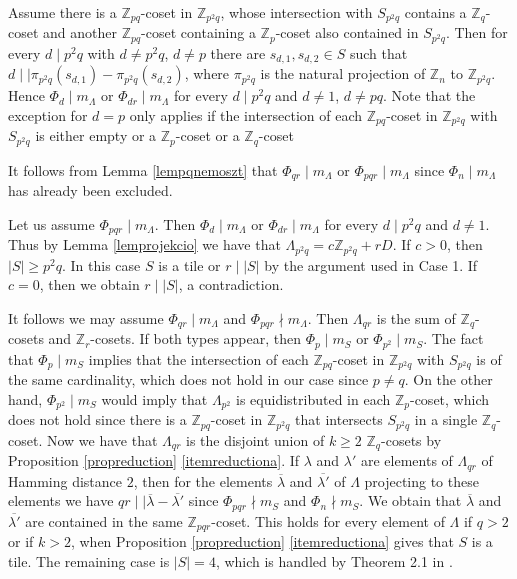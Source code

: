 \documentclass[10pt]{article}
\newcommand{\Z}{\mathbb{Z}}
\newcommand{\La}{\Lambda}
\begin{document}
        Assume there  is a $\Z_{pq}$-coset in $\Z_{p^2q}$, whose intersection with $S_{p^2q}$
        contains a $\Z_q$-coset and another $\Z_{pq}$-coset containing a $\Z_p$-coset also contained in $S_{p^2q}$. 
        Then for every $d \mid p^2q$ with $d \ne p^2q$, $d \ne p$ there are $s_{d,1},s_{d,2} \in S$ such that $d \mid \mid \pi_{p^2q}(s_{d,1})-\pi_{p^2q}(s_{d,2})$, where $\pi_{p^2q}$ is the natural projection of $\Z_n$ to $\Z_{p^2q}$. Hence $\Phi_{d} \mid m_{\La}$ or $\Phi_{dr} \mid m_{\La}$ for every $ d \mid p^2q$ and $d \ne 1$, $d \ne pq$. Note that the exception for $d=p$ only applies if the intersection of each $\Z_{pq}$-coset in $\Z_{p^2q}$ with $S_{p^2q}$ is either empty or a $\Z_p$-coset or a $\Z_q$-coset 
        
        It follows from Lemma \ref{lempqnemoszt} that $\Phi_{qr} \mid m_{\Lambda}$ or $\Phi_{pqr} \mid m_{\Lambda}$ since $\Phi_{n} \mid m_{\Lambda}$ has already been excluded.   
        
        
        
        Let us assume $\Phi_{pqr} \mid m_{\Lambda}$.
        Then $\Phi_{d} \mid m_{\La}$ or $\Phi_{dr} \mid m_{\La}$ for every $ d \mid p^2q$ and $d \ne 1$. Thus by Lemma \ref{lemprojekcio} we have that $\La_{p^2q}=c\Z_{p^2q}+rD$. If $c>0$, then $|S|\ge p^2q$. In this case $S$ is a tile or $r \mid |S|$ by the argument used in Case 1.  
        If $c=0$, then we obtain $r \mid |S|$, a contradiction. 
        
        It follows we may assume $\Phi_{qr} \mid m_{\Lambda}$ and $\Phi_{pqr} \nmid m_{\Lambda}$. Then $\Lambda_{qr}$ is the sum of $\Z_q$-cosets and $\Z_r$-cosets. If both types appear, then $\Phi_p \mid m_S$ or $\Phi_{p^2} \mid m_S$. The fact that $\Phi_p \mid m_S$ implies that   the intersection of each $\Z_{pq}$-coset in $\Z_{p^2q}$ with $S_{p^2q}$ is of the same cardinality, which does not hold in our case since $p \ne q$. On the other hand, $\Phi_{p^2} \mid m_S$ would imply that $\Lambda_{p^2}$ is equidistributed in each $\Z_p$-coset, which does not hold since there is a $\Z_{pq}$-coset in $\Z_{p^2q}$ that intersects $S_{p^2q}$ in a single $\Z_q$-coset. 
        Now we have that $\Lambda_{qr}$ is the disjoint union of $k\ge 2$ $\Z_q$-cosets  by Proposition \ref{propreduction} \ref{itemreductiona}. If $\lambda$ and $\lambda'$ are elements of $\Lambda_{qr}$ of Hamming distance $2$, then for the elements $\overline{\lambda}$ and $\overline{\lambda'}$ of $\Lambda$ projecting to these elements we have $qr \mid \mid \overline{\lambda} - \overline{\lambda'}$ since $\Phi_{pqr} \nmid m_S$ and $\Phi_{n} \nmid m_S$.
    We obtain that $\overline{\lambda}$ and $\overline{\lambda'}$ are contained in the same
    $\Z_{pqr}$-coset. This holds for every element of $\Lambda$ if $q >2$ or if $k >2$,
    when Proposition \ref{propreduction} \ref{itemreductiona} gives that $S$ is a tile.
    The remaining case is $|S|=4 $, which is handled by Theorem 2.1 in
    \cite{KMkishalmaz}.
        
\end{document}
